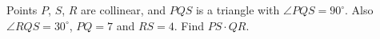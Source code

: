 Points $P$, $S$, $R$ are collinear, and $PQS$ is a triangle with $\angle PQS=90^\circ$. Also $\angle RQS=30^\circ$, $PQ=7$ and $RS=4$. Find $PS\cdot QR$.
